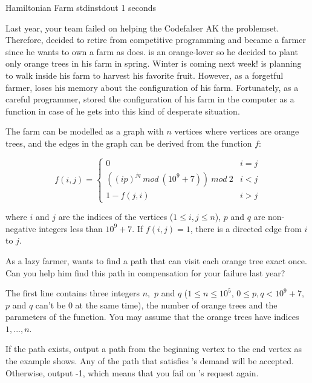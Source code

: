 \begin{problem}{Hamiltonian Farm}
{stdin}{stdout}
{1 seconds}{}{}

Last year, your team failed on helping the Codefalser \Suzukaze  AK the problemset. Therefore, \Suzukaze decided to retire from competitive programming and became a farmer since he wants to own a farm as \pittoresque does. \Suzukaze is an orange-lover so he decided to plant only orange trees in his farm in spring. Winter is coming next week! \Suzukaze is planning to walk inside his farm to harvest his favorite fruit. However, as a forgetful farmer, \Suzukaze loses his memory about the configuration of his farm. Fortunately, as a careful programmer, \Suzukaze stored the configuration of his farm in the computer as a function in case of he gets into this kind of desperate situation.
\par
The farm can be modelled as a graph with $n$ vertices where vertices are orange trees, and the edges in the graph can be derived from the function $f$:

$$f(i,j)=
\begin{cases}
0& \text{$i=j$}\\
((ip)^{jq}\ mod\ (10^{9}+7))\ mod\ 2& \text{$i<j$}\\
1-f(j,i)& \text{$i>j$}
\end{cases}$$

where $i$ and $j$ are the indices of the vertices ($1\leq i,j\leq n$), $p$ and $q$ are non-negative integers less than $10^{9}+7$. If $f(i,j)=1$, there is a directed edge from $i$ to $j$.

\par
As a lazy farmer, \Suzukaze wants to find a path that can visit each orange tree exact once. Can you help him find this path in compensation for your failure last year?

\InputFile

The first line contains three integers $n$,\ $p$ and $q$ ($1 \leq n \leq 10^{5}$, $0 \leq p,q < 10^{9}+7,$ $p$ and $q$ can't be 0 at the same time), the number of orange trees and the parameters of the function. You may assume that the orange trees have indices $1, ..., n$.

\OutputFile

If the path exists, output a path from the beginning vertex to the end vertex as the example shows. Any of the path that satisfies \Suzukaze 's demand will be accepted. Otherwise, output -1, which means that you fail on \Suzukaze 's request again.

\Examples

\begin{example}
%
\end{example}

\end{problem}
